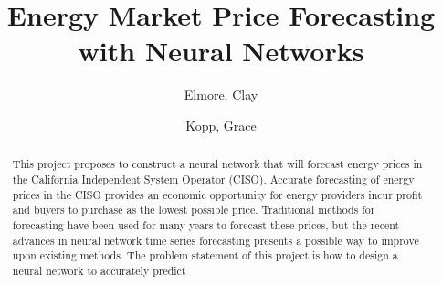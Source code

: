 \documentclass[sigconf]{acmart}
\begin{document}
%
\title{Energy Market Price Forecasting with Neural Networks}

%

\author{Elmore, Clay}

\author{Kopp, Grace}
%
\renewcommand{\shortauthors}{Elmore and Kopp, et al.}

\begin{abstract}
This project proposes to construct a neural network that will forecast energy prices in the California Independent System Operator (CISO). Accurate forecasting of energy prices in the CISO provides an economic opportunity for energy providers incur profit and buyers to purchase as the lowest possible price. Traditional methods for forecasting have been used for many years to forecast these prices, but the recent advances in neural network time series forecasting presents a possible way to improve upon existing methods. The problem statement of this project is how to design a neural network to accurately predict 
\end{abstract}
\end{document}
